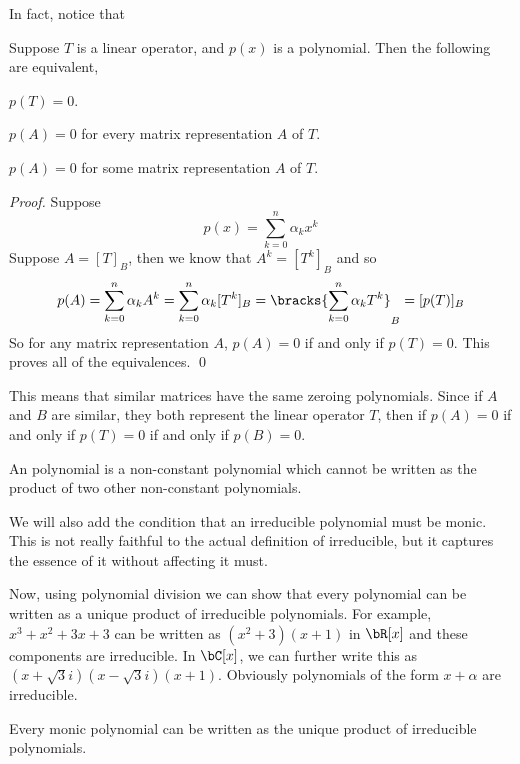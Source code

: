 In fact, notice that

\begin{prop*}[zeroRepLO]

    Suppose $T$ is a linear operator, and $p(x)$ is a polynomial.
    Then the following are equivalent,
    \benum
        \item $p(T)=0$.
        \item $p(A)=0$ for every matrix representation $A$ of $T$.
        \item $p(A)=0$ for some matrix representation $A$ of $T$.
    \eenum

\end{prop*}

\begin{proof}

    Suppose
    \[ p(x) = \sum_{k=0}^n \alpha_kx^k \]
    Suppose $A=[T]_B$, then we know that $A^k=[T^k]_B$ and so
    \[ p(A) = \sum_{k=0}^n \alpha_kA^k = \sum_{k=0}^n \alpha_k[T^k]_B = \bracks{\sum_{k=0}^n\alpha_kT^k}_B = [p(T)]_B \]
    So for any matrix representation $A$, $p(A)=0$ if and only if $p(T)=0$.
    This proves all of the equivalences.
    \qed

\end{proof}

This means that similar matrices have the same zeroing polynomials.
Since if $A$ and $B$ are similar, they both represent the linear operator $T$, then if $p(A)=0$ if and only if $p(T)=0$ if and only if $p(B)=0$.

\begin{defn*}

    An  polynomial is a non-constant polynomial which cannot be written as the product of two other non-constant polynomials.

\end{defn*}

We will also add the condition that an irreducible polynomial must be monic.
This is not really faithful to the actual definition of irreducible, but it captures the essence of it without affecting it must.

Now, using polynomial division we can show that every polynomial can be written as a unique product of irreducible polynomials.
For example, $x^3+x^2+3x+3$ can be written as $(x^2+3)(x+1)$ in $\bR[x]$ and these components are irreducible.
In $\bC[x]$, we can further write this as $(x+\sqrt3i)(x-\sqrt3i)(x+1)$.
Obviously polynomials of the form $x+\alpha$ are irreducible.

\begin{lemm*}

    Every monic polynomial can be written as the unique product of irreducible polynomials.

\end{lemm*}

